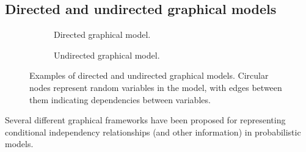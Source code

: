 
\subsection{Directed and undirected graphical models}

\begin{figure}[!t]
\centering
\begin{subfigure}[b]{.5\linewidth}
\vskip 0pt
\centering
{}
\caption{Directed graphical model.}
\label{sfig:example-directed-graphical-model}
\end{subfigure}%
\begin{subfigure}[b]{.5\linewidth}
\vskip 0pt
\centering
{}
\caption{Undirected graphical model.}
\label{sfig:example-undirected-graphical-model}
\end{subfigure}%
\caption[Directed and undirected graphical models.]{Examples of directed and undirected graphical models. Circular nodes represent random variables in the model, with edges between them indicating dependencies between variables.}%
\label{fig:example-graphical-models}
\end{figure}

Several different graphical frameworks have been proposed for representing conditional independency relationships (and other information) in probabilistic models. 

